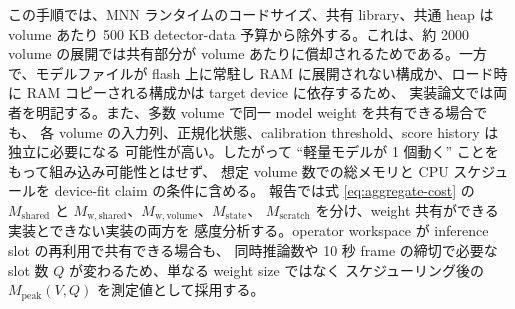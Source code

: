 この手順では、MNN ランタイムのコードサイズ、共有 library、共通 heap は
volume あたり 500 KB detector-data 予算から除外する。これは、約 2000 volume の展開では共有部分が
volume あたりに償却されるためである。一方で、モデルファイルが flash 上に常駐し
RAM に展開されない構成か、ロード時に RAM コピーされる構成かは target device に依存するため、
実装論文では両者を明記する。また、多数 volume で同一 model weight を共有できる場合でも、
各 volume の入力列、正規化状態、calibration threshold、score history は独立に必要になる
可能性が高い。したがって ``軽量モデルが 1 個動く'' ことをもって組み込み可能性とはせず、
想定 volume 数での総メモリと CPU スケジュールを device-fit claim の条件に含める。
報告では式 \eqref{eq:aggregate-cost} の $M_{\mathrm{shared}}$ と
$M_{\mathrm{w,shared}}$、$M_{\mathrm{w,volume}}$、$M_{\mathrm{state}}$、
$M_{\mathrm{scratch}}$ を分け、weight 共有ができる実装とできない実装の両方を
感度分析する。operator workspace が inference slot の再利用で共有できる場合も、
同時推論数や 10 秒 frame の締切で必要な slot 数 $Q$ が変わるため、単なる weight size ではなく
スケジューリング後の $M_{\mathrm{peak}}(V,Q)$ を測定値として採用する。
